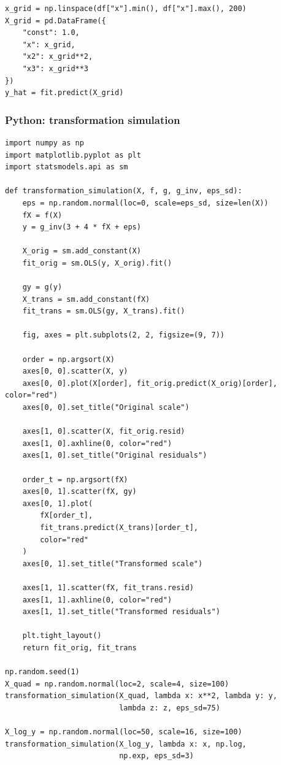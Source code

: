 \begin{verbatim}
x_grid = np.linspace(df["x"].min(), df["x"].max(), 200)
X_grid = pd.DataFrame({
    "const": 1.0,
    "x": x_grid,
    "x2": x_grid**2,
    "x3": x_grid**3
})
y_hat = fit.predict(X_grid)
\end{verbatim}

\subsubsection*{Python: transformation simulation}

\begin{verbatim}
import numpy as np
import matplotlib.pyplot as plt
import statsmodels.api as sm

def transformation_simulation(X, f, g, g_inv, eps_sd):
    eps = np.random.normal(loc=0, scale=eps_sd, size=len(X))
    fX = f(X)
    y = g_inv(3 + 4 * fX + eps)

    X_orig = sm.add_constant(X)
    fit_orig = sm.OLS(y, X_orig).fit()

    gy = g(y)
    X_trans = sm.add_constant(fX)
    fit_trans = sm.OLS(gy, X_trans).fit()

    fig, axes = plt.subplots(2, 2, figsize=(9, 7))

    order = np.argsort(X)
    axes[0, 0].scatter(X, y)
    axes[0, 0].plot(X[order], fit_orig.predict(X_orig)[order], color="red")
    axes[0, 0].set_title("Original scale")

    axes[1, 0].scatter(X, fit_orig.resid)
    axes[1, 0].axhline(0, color="red")
    axes[1, 0].set_title("Original residuals")

    order_t = np.argsort(fX)
    axes[0, 1].scatter(fX, gy)
    axes[0, 1].plot(
        fX[order_t],
        fit_trans.predict(X_trans)[order_t],
        color="red"
    )
    axes[0, 1].set_title("Transformed scale")

    axes[1, 1].scatter(fX, fit_trans.resid)
    axes[1, 1].axhline(0, color="red")
    axes[1, 1].set_title("Transformed residuals")

    plt.tight_layout()
    return fit_orig, fit_trans

np.random.seed(1)
X_quad = np.random.normal(loc=2, scale=4, size=100)
transformation_simulation(X_quad, lambda x: x**2, lambda y: y,
                          lambda z: z, eps_sd=75)

X_log_y = np.random.normal(loc=50, scale=16, size=100)
transformation_simulation(X_log_y, lambda x: x, np.log,
                          np.exp, eps_sd=3)
\end{verbatim}

